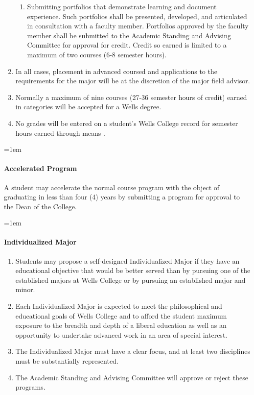 \documentclass{manual}
\newcommand{\modified}[1]{}
\let\oldparagraph\paragraph
\renewcommand\paragraph{\leftskip=1em\oldparagraph}
\newcommand{\itemLevelA}{\alph*.}
\newcommand{\itemLevelB}{\arabic*)}
\newcommand{\itemRefA}{\alph*}
\newcommand{\itemRefB}{\arabic*}
\begin{document}
\begin{enumerate}[label=\itemLevelA,ref=\itemRefA]
\begin{enumerate}[label=\itemLevelB,ref=\itemRefB]
\item \label{iitem:portfolio} Submitting portfolios that demonstrate learning and document experience. Such portfolios shall be presented, developed, and articulated in consultation with a faculty member. Portfolios approved by the faculty member shall be submitted to the Academic Standing and Advising Committee for approval for credit. Credit so earned is limited to a maximum of two courses (6-8 semester hours).
\end{enumerate}

\item In all cases, placement in advanced coursed and applications to the requirements for the major will be at the discretion of the major field advisor.
\item Normally a maximum of nine courses (27-36 semester hours of credit) earned in categories  will be accepted for a Wells degree.
\item No grades will be entered on a student's Wells College record for semester hours earned through means .
\end{enumerate}

\paragraph{Accelerated Program}
A student may accelerate the normal course program with the object of graduating in less than four (4) years by submitting a program for approval to the Dean of the College.

\paragraph{Individualized Major}

\begin{enumerate}[label=\itemLevelA,ref=\itemRefA]
\item  Students may propose a self-designed Individualized Major if they have an educational objective \modified{11/10/2009} that would be better served than by pursuing one of the established majors at Wells College or by pursuing an established major and minor.  
\item Each Individualized Major is expected to meet the philosophical and educational goals of Wells College and to afford the student maximum exposure to the breadth and depth of a liberal education as well as an opportunity to undertake advanced work in an area of special interest.  
\item The Individualized Major must have a clear focus, and at least two disciplines must be substantially represented. 
\item The Academic Standing and Advising Committee will approve or reject these programs.
\end{enumerate}
\end{document}
